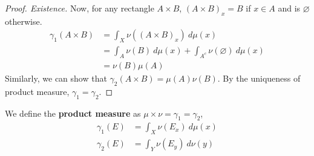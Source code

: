 \documentclass[11pt]{article}
\newcommand{\dmu}[0]{\ d\mu}
\begin{document}
\begin{theorem}
\begin{proof}[Proof. Existence]
			Now, for any rectangle $A \times B$, $(A \times B)_x = B$ if $x \in A$ and is $\varnothing$ otherwise.
			\begin{align}
				\gamma_1(A \times B) &= \int_X \nu((A \times B)_x)\dmu(x) \\
				&= \int_A \nu(B)\dmu(x) + \int_{A^c} \nu(\varnothing)\dmu(x) \\
				&= \nu(B) \mu(A)
			\end{align}
			Similarly, we can show that $\gamma_2(A\times B) = \mu(A) \nu(B)$.
			By the uniqueness of product measure, $\gamma_1 = \gamma_2$.
		\end{proof}
	\end{theorem}
	\begin{definition}
		We define the \textbf{product measure} as $\mu \times \nu = \gamma_1 = \gamma_2$,
		\begin{align}
			\gamma_1(E) &= \int_X \nu(E_x)\dmu(x) \\
			\gamma_2(E) &= \int_Y \nu(E_y)\ d\nu(y)
		\end{align}
	\end{definition}
	
\end{document}
